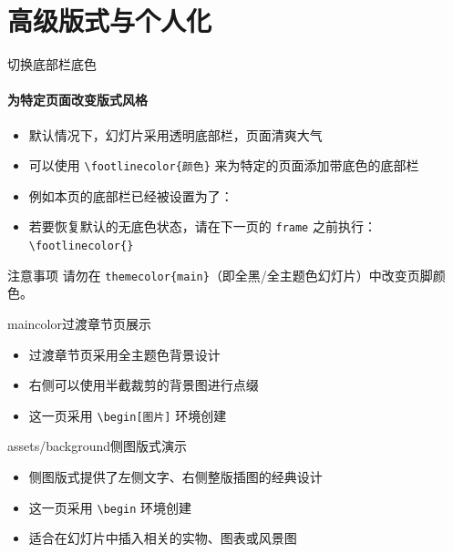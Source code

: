 \documentclass{beamer}
\begin{document}
\section{高级版式与个人化}

\begin{frame}[fragile]{切换底部栏底色}
\framesubtitle{为特定页面改变版式风格}

\begin{itemize}
    \item 默认情况下，幻灯片采用透明底部栏，页面清爽大气
    \item 可以使用 \verb|\footlinecolor{颜色}| 来为特定的页面添加带底色的底部栏
    \item 例如本页的底部栏已经被设置为了：
    \item 若要恢复默认的无底色状态，请在下一页的 \verb|frame| 之前执行：\verb|\footlinecolor{}|
\end{itemize}

\begin{block}{注意事项}
请勿在 \verb|themecolor{main}|（即全黑/全主题色幻灯片）中改变页脚颜色。
\end{block}
\end{frame}

\footlinecolor{}
\begin{chapter}{maincolor}{过渡章节页展示}
\begin{itemize}
    \item 过渡章节页采用全主题色背景设计
    \item 右侧可以使用半截裁剪的背景图进行点缀
    \item 这一页采用 \texttt{\textbackslash begin[图片]} 环境创建
\end{itemize}
\end{chapter}

\begin{sidepic}{assets/background}{侧图版式演示}
\begin{itemize}
    \item 侧图版式提供了左侧文字、右侧整版插图的经典设计
    \item 这一页采用 \texttt{\textbackslash begin} 环境创建
    \item 适合在幻灯片中插入相关的实物、图表或风景图
\end{itemize}
\end{sidepic}
\end{document}
